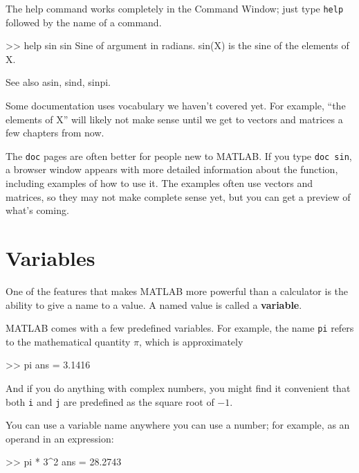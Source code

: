 \documentclass[
]{book}
\numberwithin{Answer}{chapter}
\numberwithin{Exercise}{chapter}
\begin{document}
The help command works completely in the Command Window; just 
type {\tt help} followed by the name of a command.

\begin{code}
>> help sin
 sin    Sine of argument in radians.
    sin(X) is the sine of the elements of X.
 
    See also asin, sind, sinpi.
\end{code}

Some documentation uses vocabulary we haven't covered yet.  
For example, ``the elements of X'' will likely not make sense until
we get to vectors and matrices a few chapters from now.


The {\tt doc} pages are often better for people new to MATLAB.  
If you type {\tt doc sin}, a browser window appears with more detailed information about the function, including examples of how to use it.  The examples often
use vectors and matrices, so they may not make complete sense yet, 
but you can get a preview of what's coming.


\section{Variables}

One of the features that makes MATLAB more powerful than a calculator
is the ability to give a name to a value.  A named value is called
a {\bf variable}.

 
MATLAB comes with a few predefined variables. For
example, the name {\tt pi} refers to the
mathematical quantity $\pi$, which is approximately

\begin{code}
>> pi
ans = 3.1416
\end{code}

And if you do anything with complex numbers, you might find it
convenient that both {\tt i} and {\tt j} are predefined as the square
root of $-1$.


You can use a variable name anywhere you can use a number; for example, as
an operand in an expression:

\begin{code}
>> pi * 3^2
ans = 28.2743
\end{code}
\end{document}
